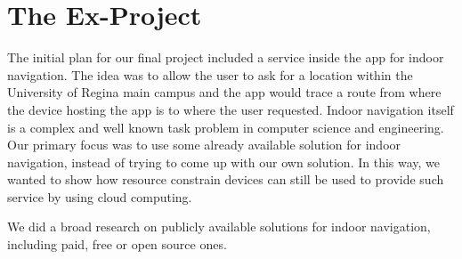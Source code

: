 \chapter{The Ex-Project}
\label{sec:ex-project}


The initial plan for our final project included a service inside the app for indoor navigation.
The idea was to allow the user to ask for a location within the University of Regina main campus and the app would trace a route from where the device hosting the app is to where the user requested.
Indoor navigation itself is a complex and well known task problem in computer science and engineering.
Our primary focus was to use some already available solution for indoor navigation, instead of trying to come up with our own solution.
In this way, we wanted to show how resource constrain devices can still be used to provide such service by using cloud computing.

We did a broad research on publicly available solutions for indoor navigation, including paid, free or open source ones.
